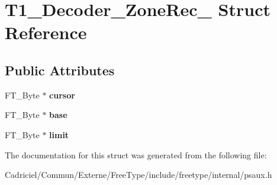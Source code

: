 \hypertarget{struct_t1___decoder___zone_rec__}{\section{T1\-\_\-\-Decoder\-\_\-\-Zone\-Rec\-\_\- Struct Reference}
\label{struct_t1___decoder___zone_rec__}
}
\subsection*{Public Attributes}
\begin{DoxyCompactItemize}
\item 
\hypertarget{struct_t1___decoder___zone_rec___a14e9f190496672f6174ead91e375767d}{F\-T\-\_\-\-Byte $\ast$ {\bfseries cursor}}\label{struct_t1___decoder___zone_rec___a14e9f190496672f6174ead91e375767d}

\item 
\hypertarget{struct_t1___decoder___zone_rec___a9cd7e54387b238504b1e8aae47b7da7c}{F\-T\-\_\-\-Byte $\ast$ {\bfseries base}}\label{struct_t1___decoder___zone_rec___a9cd7e54387b238504b1e8aae47b7da7c}

\item 
\hypertarget{struct_t1___decoder___zone_rec___a46fe1e4aa9bdb712ae414305f88d95db}{F\-T\-\_\-\-Byte $\ast$ {\bfseries limit}}\label{struct_t1___decoder___zone_rec___a46fe1e4aa9bdb712ae414305f88d95db}

\end{DoxyCompactItemize}


The documentation for this struct was generated from the following file\-:\begin{DoxyCompactItemize}
\item 
Cadriciel/\-Commun/\-Externe/\-Free\-Type/include/freetype/internal/psaux.\-h\end{DoxyCompactItemize}
